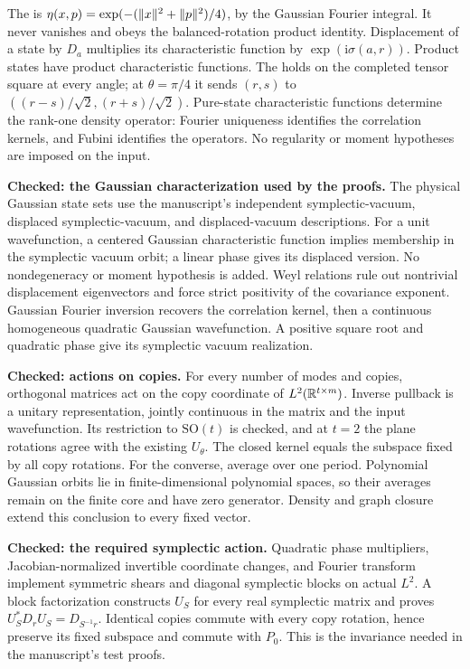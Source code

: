 \begin{lemma}
  The  is
  $\eta(x,p)=\exp(-(\lVert x \rVert^2+\lVert p \rVert^2)/4)$, by the Gaussian Fourier integral.
  It never vanishes and obeys the balanced-rotation product identity.
  Displacement of a state by $D_a$ multiplies its characteristic function by
  $\exp(\mathrm{i}\sigma(a,r))$. Product states have product characteristic
  functions. The 
  holds on the completed tensor square at every angle; at $\theta=\pi/4$
  it sends $(r,s)$ to $((r-s)/\sqrt2,(r+s)/\sqrt2)$.
  Pure-state characteristic functions determine the rank-one density operator:
  Fourier uniqueness identifies the correlation kernels, and Fubini identifies
  the operators. No regularity or moment hypotheses are imposed on the input.

  \textbf{Checked: the Gaussian characterization used by the proofs.}
  The physical Gaussian state sets use the manuscript's independent
  symplectic-vacuum, displaced symplectic-vacuum, and displaced-vacuum
  descriptions. For a unit wavefunction, a centered Gaussian characteristic
  function implies membership in the symplectic vacuum orbit; a linear phase
  gives its displaced version. No nondegeneracy or moment hypothesis is added.
  Weyl relations rule out nontrivial displacement eigenvectors and force strict
  positivity of the covariance exponent. Gaussian Fourier inversion recovers
  the correlation kernel, then a continuous homogeneous quadratic Gaussian
  wavefunction. A positive square root and quadratic phase give its symplectic
  vacuum realization.

  \textbf{Checked: actions on copies.}
  For every number of modes and copies, orthogonal matrices act on the copy
  coordinate of $L^2(\mathbb{R}^{t\times m})$. Inverse pullback is a unitary
  representation, jointly continuous in the matrix and the input wavefunction.
  Its restriction to $\mathrm{SO}(t)$ is checked, and at $t=2$ the plane
  rotations agree with the existing $U_\theta$.
  The closed kernel equals the subspace fixed by all copy rotations.
  For the converse, average over one period. Polynomial Gaussian orbits lie
  in finite-dimensional polynomial spaces, so their averages remain on the
  finite core and have zero generator. Density and graph closure extend
  this conclusion to every fixed vector.

  \textbf{Checked: the required symplectic action.}
  Quadratic phase multipliers, Jacobian-normalized invertible coordinate
  changes, and Fourier transform implement symmetric shears and diagonal
  symplectic blocks on actual $L^2$. A block factorization constructs $U_S$
  for every real symplectic matrix and proves
  $U_S^*D_rU_S=D_{S^{-1}r}$. Identical copies commute with every copy rotation,
  hence preserve its fixed subspace and commute with $P_0$. This is the
  invariance needed in the manuscript's test proofs.


\end{lemma}
